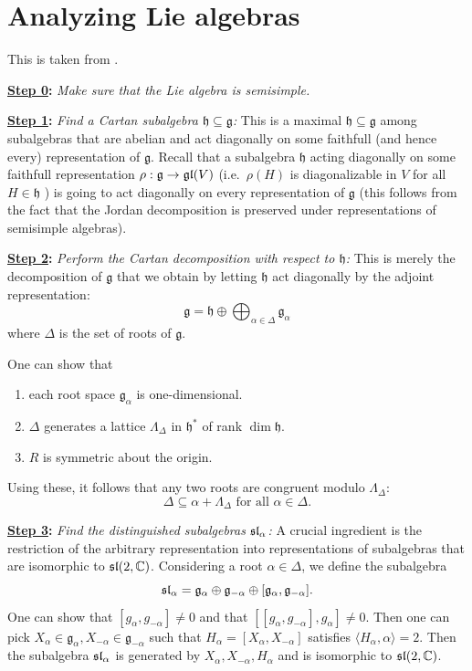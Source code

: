 \documentclass{report}
\begin{document}
\chapter{Analyzing Lie algebras}
This is taken from \cite[§14]{fulton2013representation}.

{\bf \underline{Step 0}:} \emph{Make sure that the Lie algebra is semisimple.}

{\bf \underline{Step 1}:} \emph{Find a Cartan subalgebra $\mathfrak h \subseteq \mathfrak g$:}
This is a maximal $\mathfrak h \subseteq \mathfrak g$ among subalgebras that are abelian and act diagonally on some faithfull (and hence every) representation of $\mathfrak g$.
Recall that a subalgebra $\mathfrak h$ acting diagonally on some faithfull representation $\rho: \mathfrak g \to \operatorname{{\mathfrak{gl}}}(V)$ (i.e.\ $\rho(H)$ is diagonalizable in $V$ for all $H \in \mathfrak h$ ) is going to act diagonally on every representation of $\mathfrak g$ (this follows from the fact that the Jordan decomposition is preserved under representations of semisimple algebras).

{\bf \underline{Step 2}:} \emph{Perform the Cartan decomposition with respect to $\mathfrak h$:}
This is merely the decomposition of $\mathfrak g$ that we obtain by letting $\mathfrak h$ act diagonally by the adjoint representation:
\[
\mathfrak g = \mathfrak h \oplus \bigoplus_{\alpha \in \Delta} \mathfrak g_\alpha
\]
where $\Delta$ is the set of roots of $\mathfrak g$.

One can show that
\begin{enumerate}[label = (\roman*)]
    \item each root space $\mathfrak g_\alpha$ is one-dimensional.
    \item $\Delta$ generates a lattice $\Lambda_\Delta$ in $\mathfrak h^*$ of rank $\dim \mathfrak h$.
    \item $R$ is symmetric about the origin.
\end{enumerate}
Using these, it follows that any two roots are congruent modulo $\Lambda_\Delta$:
\[
\Delta \subseteq \alpha + \Lambda_\Delta \text{ for all } \alpha \in \Delta.
\]

{\bf \underline{Step 3}:} \emph{Find the distinguished subalgebras $\operatorname{{\mathfrak{sl}}}_\alpha$:}
A crucial ingredient is the restriction of the arbitrary representation into representations of subalgebras that are isomorphic to $\operatorname{{\mathfrak{sl}}}(2, \mathbb C)$.
Considering a root $\alpha \in \Delta$, we define the subalgebra
\[
\operatorname{{\mathfrak{sl}}}_\alpha = \mathfrak g_\alpha \oplus \mathfrak g_{-\alpha} \oplus [\mathfrak g_\alpha, \mathfrak g_{-\alpha}].
\]
One can show that $[g_\alpha, g_{-\alpha}] \neq 0$ and that $[[g_\alpha, g_{-\alpha}], g_\alpha] \neq 0$.
Then one can pick $X_\alpha \in \mathfrak g_\alpha, X_{-\alpha} \in \mathfrak g_{-\alpha}$ such that $H_\alpha = [X_\alpha, X_{-\alpha}]$ satisfies $\langle H_\alpha, \alpha \rangle = 2$.
Then the subalgebra $\operatorname{{\mathfrak{sl}}}_\alpha$ is generated by $X_\alpha, X_{-\alpha}, H_\alpha$ and is isomorphic to $\operatorname{{\mathfrak{sl}}}(2, \mathbb C)$.
\end{document}
